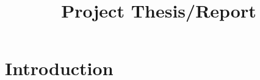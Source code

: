 \documentclass[12 pt]{article}
\begin{document}
\title{Project Thesis/Report}



\author{} 
\date{}
\date{}
\maketitle

\section{Introduction}\label{ch1}




\end{document}
